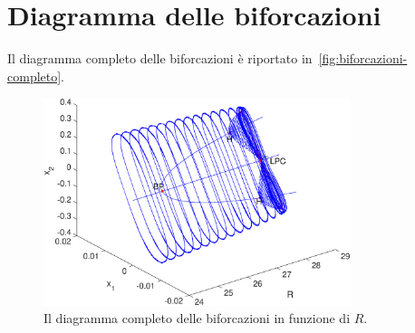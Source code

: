 \section{Diagramma delle biforcazioni}

Il diagramma completo delle biforcazioni è riportato in~\autoref{fig:biforcazioni-completo}.

\begin{figure}[h]
\centering
\includegraphics[width=0.8\textwidth]{matcont/BiforcazioniCompleto}
\caption{Il diagramma completo delle biforcazioni in funzione di $R$.}
\label{fig:biforcazioni-completo}
\end{figure}
